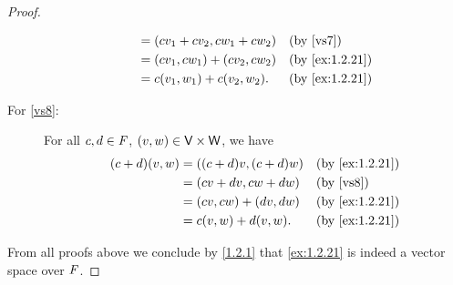 \begin{proof}
\begin{description}
\begin{align*}
				                                          & = \p{cv_{1} + cv_{2}, cw_{1} + cw_{2}}      &  & \text{(by \ref{vs7})}        \\
				                                          & = \p{cv_{1}, cw_{1}} + \p{cv_{2}, cw_{2}}   &  & \text{(by \cref{ex:1.2.21})} \\
				                                          & = c\p{v_{1}, w_{1}} + c\p{v_{2}, w_{2}}.    &  & \text{(by \cref{ex:1.2.21})}
			\end{align*}
		\item[For \ref{vs8}:]
			For all \(c, d \in \mathit{F}\), \(\left\lparen v, w\right\rparen \in \mathsf{V} \times \mathsf{W}\), we have
			\begin{align*}
				\p{c + d} \p{v, w} & = \p{\p{c + d} v, \p{c + d} w} &  & \text{(by \cref{ex:1.2.21})} \\
				                   & = \p{cv + dv, cw + dw}         &  & \text{(by \ref{vs8})}        \\
				                   & = \p{cv, cw} + \p{dv, dw}      &  & \text{(by \cref{ex:1.2.21})} \\
				                   & = c\p{v, w} + d\p{v, w}.       &  & \text{(by \cref{ex:1.2.21})}
			\end{align*}
	\end{description}
	From all proofs above we conclude by \cref{1.2.1} that \cref{ex:1.2.21} is indeed a vector space over \(\mathit{F}\).
\end{proof}
